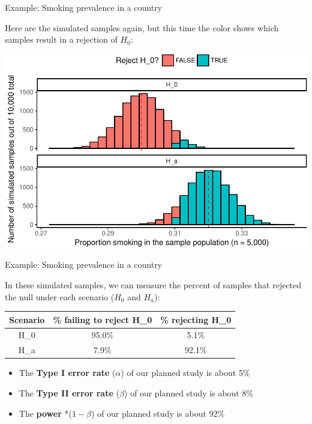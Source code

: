 \documentclass[ignorenonframetext,]{beamer}
\providecommand{\tightlist}{%
  \setlength{\itemsep}{0pt}\setlength{\parskip}{0pt}}
\begin{document}
\begin{frame}{Example: Smoking prevalence in a country}

Here are the simulated samples again, but this time the color shows
which samples result in a rejection of \(H_0\):

\begin{center}\includegraphics[height=0.7\textheight]{sample_size_files/figure-beamer/unnamed-chunk-2-1} \end{center}

\end{frame}

\begin{frame}{Example: Smoking prevalence in a country}

In these simulated samples, we can measure the percent of samples that
rejected the null under each scenario (\(H_0\) and \(H_a\)):

\begin{longtable}[]{@{}ccc@{}}
\toprule
Scenario & \% failing to reject H\_0 & \% rejecting H\_0\tabularnewline
\midrule
\endhead
H\_0 & 95.0\% & 5.1\%\tabularnewline
H\_a & 7.9\% & 92.1\%\tabularnewline
\bottomrule
\end{longtable}

\begin{itemize}
\tightlist
\item
  The \textbf{Type I error rate} (\(\alpha\)) of our planned study is
  about 5\%
\item
  The \textbf{Type II error rate} (\(\beta\)) of our planned study is
  about 8\%
\item
  The \textbf{power} *(\(1 - \beta\)) of our planned study is about 92\%
\end{itemize}

\end{frame}
\end{document}

